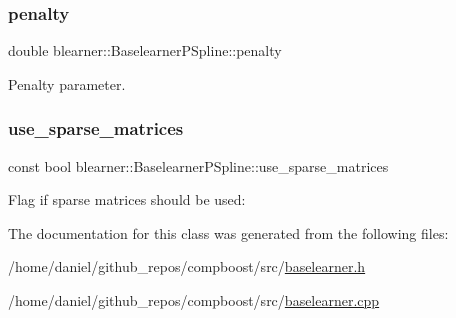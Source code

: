 \subsubsection{\texorpdfstring{penalty}{penalty}}
{\footnotesize\ttfamily double blearner\+::\+Baselearner\+P\+Spline\+::penalty\hspace{0.3cm}{\ttfamily [private]}}



Penalty parameter. 

\mbox{\label{classblearner_1_1_baselearner_p_spline_abc38580ee231aa0173fdea22bb9b2283}} 
\subsubsection{\texorpdfstring{use\+\_\+sparse\+\_\+matrices}{use\_sparse\_matrices}}
{\footnotesize\ttfamily const bool blearner\+::\+Baselearner\+P\+Spline\+::use\+\_\+sparse\+\_\+matrices\hspace{0.3cm}{\ttfamily [private]}}



Flag if sparse matrices should be used\+: 



The documentation for this class was generated from the following files\+:\begin{DoxyCompactItemize}
\item 
/home/daniel/github\+\_\+repos/compboost/src/\hyperlink{baselearner_8h}{baselearner.\+h}\item 
/home/daniel/github\+\_\+repos/compboost/src/\hyperlink{baselearner_8cpp}{baselearner.\+cpp}\end{DoxyCompactItemize}

